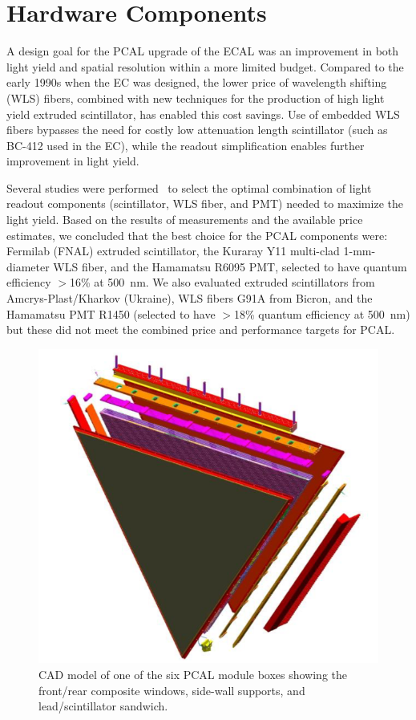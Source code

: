 \section{Hardware Components}
\label{HW}

A design goal for the PCAL upgrade of the ECAL was an improvement in both light yield and spatial resolution
within a more limited budget. Compared to the early 1990s when the EC was designed, the lower price of
wavelength shifting (WLS) fibers, combined with new techniques for the production of high light yield extruded
scintillator, has enabled this cost savings. Use of embedded WLS fibers bypasses the need for costly low
attenuation length scintillator (such as BC-412 used in the EC), while the readout simplification enables further
improvement in light yield.

Several studies were performed~\cite{2007002,2007007,2009018} to select the optimal combination of light
readout components (scintillator, WLS fiber, and PMT) needed to maximize the light yield. Based on
the results of measurements and the available price estimates, we concluded that the best choice for the PCAL
components were: Fermilab (FNAL) extruded scintillator, the Kuraray Y11 multi-clad 1-mm-diameter WLS fiber,
and the Hamamatsu R6095 PMT, selected to have quantum efficiency $>$16\% at 500~nm. We also evaluated
extruded scintillators from Amcrys-Plast/Kharkov (Ukraine), WLS fibers G91A from Bicron, and the Hamamatsu
PMT R1450 (selected to have $>$18\% quantum efficiency at 500~nm) but these did not meet the combined
price and performance targets for PCAL. 

\begin{figure}[hbt]
\centering
\includegraphics[width=0.95\columnwidth,keepaspectratio]{img/S4_0.png}
\caption{CAD model of one of the six PCAL module boxes showing the front/rear composite windows, side-wall
  supports, and lead/scintillator sandwich.}
\label{fig:S4_0}
\end{figure}

